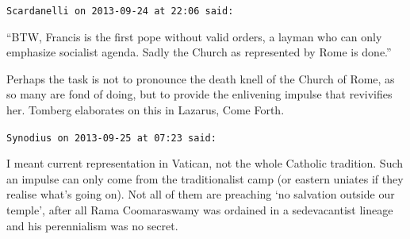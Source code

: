 \begin{footnotesize}
\begin{sffamily}
\hfill

\texttt{Scardanelli on 2013-09-24 at 22:06 said:}

``BTW, Francis is the first pope without valid orders, a layman who can only emphasize socialist agenda. Sadly the Church as represented by Rome is done.''

Perhaps the task is not to pronounce the death knell of the Church of Rome, as so many are fond of doing, but to provide the enlivening impulse that revivifies her. Tomberg elaborates on this in Lazarus, Come Forth.

\hfill

\texttt{Synodius on 2013-09-25 at 07:23 said:}

I meant current representation in Vatican, not the whole Catholic tradition. Such an impulse can only come from the traditionalist camp (or eastern uniates if they realise what's going on). Not all of them are preaching `no salvation outside our temple', after all Rama Coomaraswamy was ordained in a sedevacantist lineage and his perennialism was no secret.

\hfill

\end{sffamily}
\end{footnotesize}

